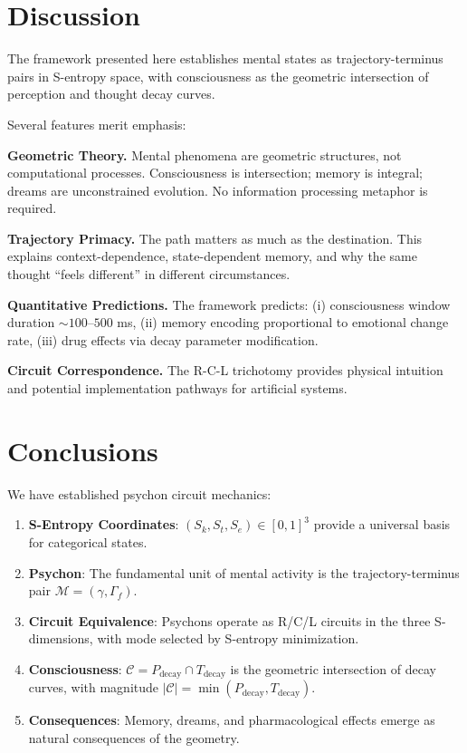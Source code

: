\documentclass[twocolumn,amsmath,amssymb,aps,prl,superscriptaddress]{revtex4-2}
\newcommand{\Sk}{S_k}
\newcommand{\St}{S_t}
\newcommand{\Se}{S_e}
\newcommand{\Mstate}{\mathcal{M}}
\newcommand{\Ccat}{\mathcal{C}}
\newcommand{\Pdecay}{P_{\text{decay}}}
\newcommand{\Tdecay}{T_{\text{decay}}}
\newcommand{\Gstate}{\Gamma}
\newcommand{\traj}{\gamma}
\begin{document}
\section{Discussion}

The framework presented here establishes mental states as trajectory-terminus pairs in S-entropy space, with consciousness as the geometric intersection of perception and thought decay curves.

Several features merit emphasis:

\textbf{Geometric Theory.} Mental phenomena are geometric structures, not computational processes. Consciousness is intersection; memory is integral; dreams are unconstrained evolution. No information processing metaphor is required.

\textbf{Trajectory Primacy.} The path matters as much as the destination. This explains context-dependence, state-dependent memory, and why the same thought ``feels different'' in different circumstances.

\textbf{Quantitative Predictions.} The framework predicts: (i) consciousness window duration $\sim 100$--$500$ ms, (ii) memory encoding proportional to emotional change rate, (iii) drug effects via decay parameter modification.

\textbf{Circuit Correspondence.} The R-C-L trichotomy provides physical intuition and potential implementation pathways for artificial systems.

\section{Conclusions}

We have established psychon circuit mechanics:

\begin{enumerate}
\item \textbf{S-Entropy Coordinates}: $(\Sk, \St, \Se) \in [0,1]^3$ provide a universal basis for categorical states.

\item \textbf{Psychon}: The fundamental unit of mental activity is the trajectory-terminus pair $\Mstate = (\traj, \Gstate_f)$.

\item \textbf{Circuit Equivalence}: Psychons operate as R/C/L circuits in the three S-dimensions, with mode selected by S-entropy minimization.

\item \textbf{Consciousness}: $\Ccat = \Pdecay \cap \Tdecay$ is the geometric intersection of decay curves, with magnitude $|\Ccat| = \min(\Pdecay, \Tdecay)$.

\item \textbf{Consequences}: Memory, dreams, and pharmacological effects emerge as natural consequences of the geometry.
\end{enumerate}
\end{document}
